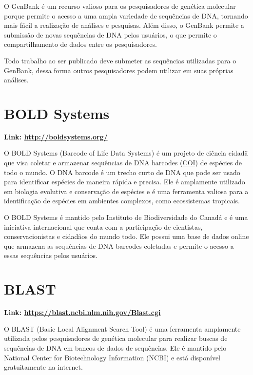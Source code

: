 \documentclass[
  letterpaper,
  DIV=11,
  numbers=noendperiod]{scrreprt}
\begin{document}
O GenBank é um recurso valioso para os pesquisadores de genética
molecular porque permite o acesso a uma ampla variedade de sequências de
DNA, tornando mais fácil a realização de análises e pesquisas. Além
disso, o GenBank permite a submissão de novas sequências de DNA pelos
usuários, o que permite o compartilhamento de dados entre os
pesquisadores.

Todo trabalho ao ser publicado deve submeter as sequências utilizadas
para o GenBank, dessa forma outros pesquisadores podem utilizar em suas
próprias análises.

\hypertarget{bold-systems}{%
\section{BOLD Systems}\label{bold-systems}}

\textbf{Link: \href{}{http://boldsystems.org/}}

O BOLD Systems (Barcode of Life Data Systems) é um projeto de ciência
cidadã que visa coletar e armazenar sequências de DNA barcodes
(\protect\hyperlink{marcadores-moleculares}{COI}) de espécies de todo o
mundo. O DNA barcode é um trecho curto de DNA que pode ser usado para
identificar espécies de maneira rápida e precisa. Ele é amplamente
utilizado em biologia evolutiva e conservação de espécies e é uma
ferramenta valiosa para a identificação de espécies em ambientes
complexos, como ecossistemas tropicais.

O BOLD Systems é mantido pelo Instituto de Biodiversidade do Canadá e é
uma iniciativa internacional que conta com a participação de cientistas,
conservacionistas e cidadãos do mundo todo. Ele possui uma base de dados
online que armazena as sequências de DNA barcodes coletadas e permite o
acesso a essas sequências pelos usuários.

\hypertarget{blast}{%
\section{BLAST}\label{blast}}

\textbf{Link: \href{}{https://blast.ncbi.nlm.nih.gov/Blast.cgi}}

O BLAST (Basic Local Alignment Search Tool) é uma ferramenta amplamente
utilizada pelos pesquisadores de genética molecular para realizar buscas
de sequências de DNA em bancos de dados de sequências. Ele é mantido
pelo National Center for Biotechnology Information (NCBI) e está
disponível gratuitamente na internet.
\end{document}
